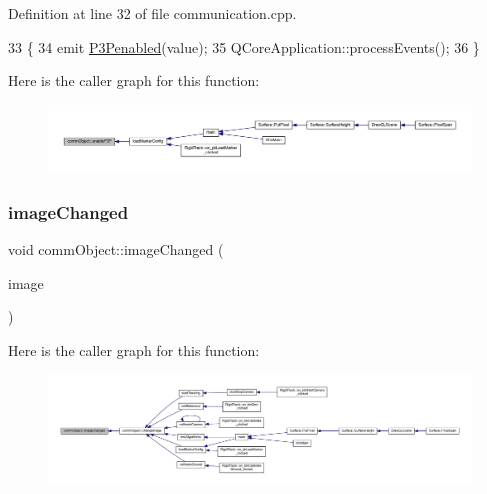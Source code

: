 Definition at line 32 of file communication.\+cpp.


\begin{DoxyCode}
33 \{
34     emit \hyperlink{classcomm_object_af369de87a7f2c9b7170223bedd6c08d9}{P3Penabled}(value);
35     QCoreApplication::processEvents();
36 \}
\end{DoxyCode}
Here is the caller graph for this function\+:
\nopagebreak
\begin{figure}[H]
\begin{center}
\leavevmode
\includegraphics[width=350pt]{classcomm_object_a7552116eb5e18c49c6dcf943de29af7a_icgraph}
\end{center}
\end{figure}
\mbox{\label{classcomm_object_a3828eab6be234f6216a6f80a6a82e41e}} 
\subsubsection{\texorpdfstring{image\+Changed}{imageChanged}}
{\footnotesize\ttfamily void comm\+Object\+::image\+Changed (\begin{DoxyParamCaption}\item[{Q\+Pixmap}]{image }\end{DoxyParamCaption})\hspace{0.3cm}{\ttfamily [signal]}}

Here is the caller graph for this function\+:
\nopagebreak
\begin{figure}[H]
\begin{center}
\leavevmode
\includegraphics[width=350pt]{classcomm_object_a3828eab6be234f6216a6f80a6a82e41e_icgraph}
\end{center}
\end{figure}
\mbox{\label{classcomm_object_a72620fe1bac16309baf6d148644edaf9}} 
